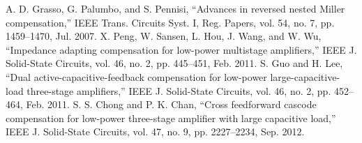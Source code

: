 \documentclass[a4paper,12pt]{article} %
\begin{document}
\begin{thebibliography}{}
 A. D. Grasso, G. Palumbo, and S. Pennisi, “Advances in reversed
nested Miller compensation,” IEEE Trans. Circuits Syst. I, Reg.
Papers, vol. 54, no. 7, pp. 1459–1470, Jul. 2007.
 X. Peng, W. Sansen, L. Hou, J. Wang, and W. Wu, “Impedance adapting compensation for low-power multistage amplifiers,” IEEE J. Solid-State Circuits, vol. 46, no. 2, pp. 445–451, Feb. 2011.
 S. Guo and H. Lee, “Dual active-capacitive-feedback compensation
for low-power large-capacitive-load three-stage amplifiers,” IEEE J.
Solid-State Circuits, vol. 46, no. 2, pp. 452–464, Feb. 2011.
 S. S. Chong and P. K. Chan, “Cross feedforward cascode compensation
for low-power three-stage amplifier with large capacitive load,” IEEE
J. Solid-State Circuits, vol. 47, no. 9, pp. 2227–2234, Sep. 2012.

\end{thebibliography}
\end{document}
